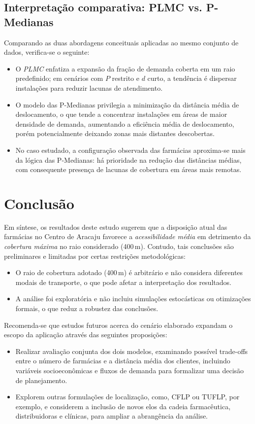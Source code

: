 \documentclass[12pt]{article}
\begin{document}
\subsection{Interpretação comparativa: PLMC vs. P-Medianas}

Comparando as duas abordagens conceituais aplicadas ao mesmo conjunto de dados, verifica-se o seguinte:

\begin{itemize}
    \item O \emph{PLMC} enfatiza a expansão da fração de demanda coberta em um raio predefinido; em cenários com \(P\) restrito e \(d\) curto, a tendência é dispersar instalações para reduzir lacunas de atendimento.
    \item O modelo das P-Medianas privilegia a minimização da distância média de deslocamento, o que tende a concentrar instalações em áreas de maior densidade de demanda, aumentando a eficiência média de deslocamento, porém potencialmente deixando zonas mais distantes descobertas.
    \item No caso estudado, a configuração observada das farmácias aproxima-se mais da lógica das P-Medianas: há prioridade na redução das distâncias médias, com consequente presença de lacunas de cobertura em áreas mais remotas.
\end{itemize}

\section{Conclusão}
Em síntese, os resultados deste estudo sugerem que a disposição atual das farmácias no Centro de Aracaju favorece a \emph{acessibilidade média} em detrimento da \emph{cobertura máxima} no raio considerado (400\,m). Contudo, tais conclusões são preliminares e limitadas por certas restrições metodológicas:

\begin{itemize}
    \item O raio de cobertura adotado (400\,m) é arbitrário e não considera diferentes modais de transporte, o que pode afetar a interpretação dos resultados.
    \item A análise foi exploratória e não incluiu simulações estocásticas ou otimizações formais, o que reduz a robustez das conclusões.
\end{itemize}

Recomenda-se que estudos futuros acerca do cenário elaborado expandam o escopo da aplicação através das seguintes proposições:
\begin{itemize}
    \item Realizar avaliação conjunta dos dois modelos, examinando possível trade-offs entre o número de farmácias e a distância média dos clientes, incluindo variáveis socioeconômicas e fluxos de demanda para formalizar uma decisão de planejamento.
    \item Explorem outras formulações de localização, como, CFLP ou TUFLP, por exemplo, e considerem a inclusão de novos elos da cadeia farmacêutica, distribuidoras e clínicas, para ampliar a abrangência da análise.
\end{itemize}
\end{document}
